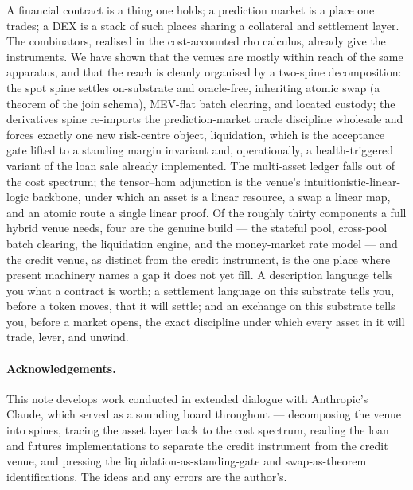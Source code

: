 \documentclass[11pt]{article}
\theoremstyle{definition}
\begin{document}
A financial contract is a thing one holds; a prediction market is a place one trades; a DEX is a stack
of such places sharing a collateral and settlement layer. The combinators, realised in the
cost-accounted rho calculus, already give the instruments. We have shown that the venues are mostly
within reach of the same apparatus, and that the reach is cleanly organised by a two-spine
decomposition: the spot spine settles on-substrate and oracle-free, inheriting atomic swap (a theorem
of the join schema), MEV-flat batch clearing, and located custody; the derivatives spine re-imports the
prediction-market oracle discipline wholesale and forces exactly one new risk-centre object, liquidation,
which is the acceptance gate lifted to a standing margin invariant and, operationally, a health-triggered
variant of the loan sale already implemented. The multi-asset ledger falls out of the cost spectrum; the
tensor--hom adjunction is the venue's intuitionistic-linear-logic backbone, under which an asset is a
linear resource, a swap a linear map, and an atomic route a single linear proof. Of the roughly thirty
components a full hybrid venue needs, four are the genuine build --- the stateful pool, cross-pool batch
clearing, the liquidation engine, and the money-market rate model --- and the credit venue, as distinct
from the credit instrument, is the one place where present machinery names a gap it does not yet fill. A
description language tells you what a contract is worth; a settlement language on this substrate tells
you, before a token moves, that it will settle; and an exchange on this substrate tells you, before a
market opens, the exact discipline under which every asset in it will trade, lever, and unwind.

\paragraph{Acknowledgements.}
This note develops work conducted in extended dialogue with Anthropic's Claude, which served as a
sounding board throughout --- decomposing the venue into spines, tracing the asset layer back to the
cost spectrum, reading the loan and futures implementations to separate the credit instrument from the
credit venue, and pressing the liquidation-as-standing-gate and swap-as-theorem identifications. The
ideas and any errors are the author's.
\end{document}
